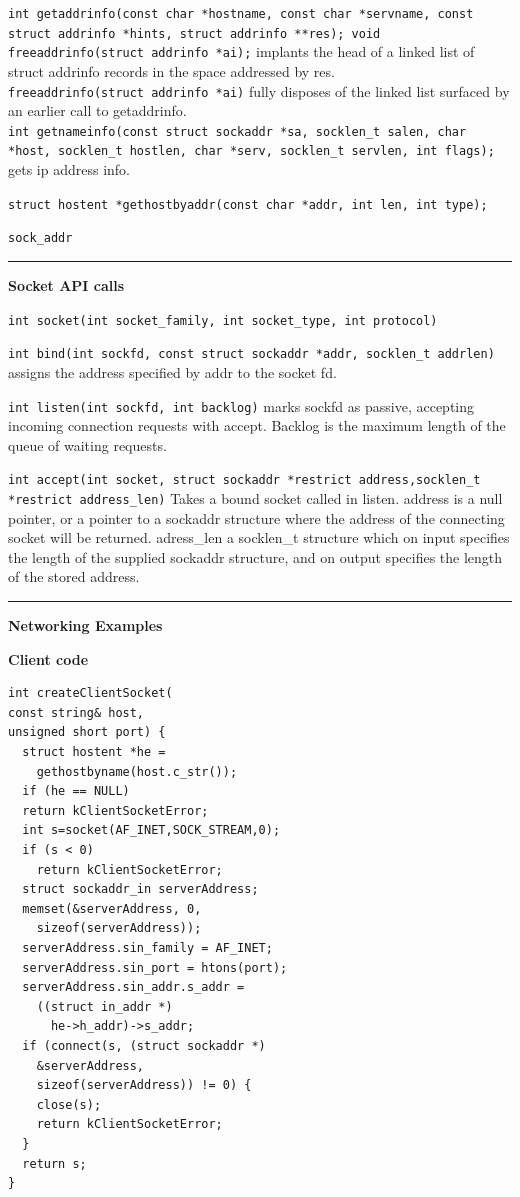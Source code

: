\documentclass{article}
\begin{document}
\begin{multicols}{2}
  {\tt int getaddrinfo(const char *hostname, const char *servname,
  const struct addrinfo *hints, struct addrinfo **res);
  void freeaddrinfo(struct addrinfo *ai);} implants the head of a
  linked list of struct addrinfo records in the space addressed by
  res.\\
  {\tt freeaddrinfo(struct addrinfo *ai)} fully disposes of the linked list
  surfaced by an earlier call to getaddrinfo.\\
  {\tt int getnameinfo(const struct sockaddr *sa, socklen\_t salen,
  char *host, socklen\_t hostlen,
  char *serv, socklen\_t servlen, int flags);} gets ip address info.

  {\tt struct hostent *gethostbyaddr(const char *addr, int len, int type);}

  {\tt sock\_addr}

  \noindent\rule{4cm}{0.4pt}

  {\bf Socket API calls}

  {\tt int socket(int socket\_family, int socket\_type, int protocol)}

  {\tt int bind(int sockfd, const struct sockaddr *addr, socklen\_t addrlen)}
  assigns the address specified by addr to the socket fd.

  {\tt int listen(int sockfd, int backlog)} marks sockfd as passive, accepting
  incoming connection requests with accept. Backlog is the maximum length of the
  queue of waiting requests.

  {\tt int accept(int socket, struct sockaddr *restrict address,socklen\_t
  *restrict address\_len)} Takes a bound socket called in listen. address is a
  null pointer, or a pointer to a sockaddr structure where the address of the
  connecting socket will be returned. adress\_len a socklen\_t structure which on
  input specifies the length of the supplied sockaddr structure, and on output
  specifies the length of the stored address.

  \noindent\rule{4cm}{0.4pt}

  {\bf Networking Examples}

  {\bf Client code}
  \begin{verbatim}
int createClientSocket(
const string& host,
unsigned short port) {
  struct hostent *he =
    gethostbyname(host.c_str());
  if (he == NULL)
  return kClientSocketError;
  int s=socket(AF_INET,SOCK_STREAM,0);
  if (s < 0)
    return kClientSocketError;
  struct sockaddr_in serverAddress;
  memset(&serverAddress, 0,
    sizeof(serverAddress));
  serverAddress.sin_family = AF_INET;
  serverAddress.sin_port = htons(port);
  serverAddress.sin_addr.s_addr =
    ((struct in_addr *)
      he->h_addr)->s_addr;
  if (connect(s, (struct sockaddr *)
    &serverAddress,
    sizeof(serverAddress)) != 0) {
    close(s);
    return kClientSocketError;
  }
  return s;
}


\end{verbatim}
\end{multicols}
\end{document}
